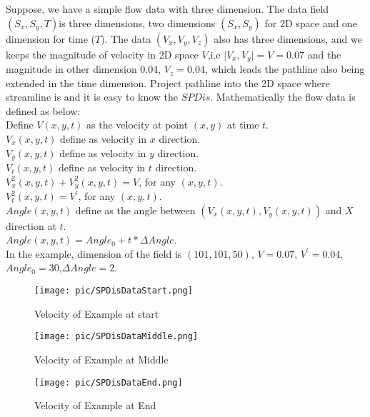 \documentclass[
     11pt,         %
     a4paper,      %
     oneside,
     ]{article}
\begin{document}
	Suppose, we have a simple flow data with three dimension. The data field $(S_{x},S_{y},T)$is three dimensions, two dimensions $(S_{x},S_{y})$ for 2D space and one dimension for time ($T$). The data $(V_{x},V_{y},V_{z})$ also has three dimensions, and we keeps the magnitude of velocity in 2D space $V$,i.e $\lvert V_{x},V_{y}\rvert=V=0.07$ and the magnitude in other dimension  0.04, $V_{z}=0.04$, which leads the pathline also being extended in the time dimension. Project pathline into the 2D space where streamline is and it is easy to know the $SPDis$. 
	Mathematically the flow data is defined as below:\\
	Define $V(x,y,t)$ as the velocity at point $(x,y)$ at time $t$.\\
	$V_{x}(x,y,t)$ define as velocity in $x$ direction.\\
	$V_{y}(x,y,t)$ define as velocity in $y$ direction.\\
	$V_{t}(x,y,t)$ define as velocity in $t$ direction.\\
	$V^{2}_{x}(x,y,t)+V^{2}_{y}(x,y,t)=V$, for any $(x,y,t)$.\\ 
	$V^{2}_{t}(x,y,t)=V^{'}$, for any $(x,y,t)$.\\
	$Angle(x,y,t)$ define as the angle between $(V_{x}(x,y,t),V_{y}(x,y,t))$ and $X$ direction at $t$.\\
	$Angle(x,y,t)=Angle_{0}+t*\Delta Angle$.\\
	In the example, dimension of the field is $(101,101,50)$, $V=0.07$, $V^{'}=0.04$, $Angle_{0}=30$,$\Delta Angle=2$.
	\begin{figure}[H]
		\centering
		\begin{minipage}{0.45\textwidth}
			\centering
            \texttt{[image: pic/SPDisDataStart.png]}
            \caption{\tiny Velocity of Example at start }
            \label{fig:VelocityofExampleAtStart}
		\end{minipage}
		\begin{minipage}{0.45\textwidth}
			\centering
			\texttt{[image: pic/SPDisDataMiddle.png]}
			\caption{\tiny Velocity of Example at Middle }
			\label{fig:VelocityofExampleAtMiddle}
	    \end{minipage}
		\begin{minipage}{0.45\textwidth}
			\centering
			\texttt{[image: pic/SPDisDataEnd.png]}
			\caption{\tiny Velocity of Example at End }
			\label{fig:VelocityofExampleAtEnd}
		\end{minipage}
	\end{figure}
\end{document}
